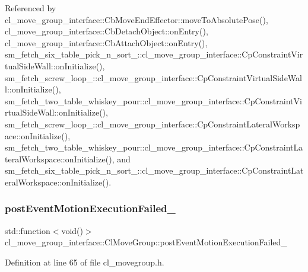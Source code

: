 Referenced by cl\+\_\+move\+\_\+group\+\_\+interface\+::\+Cb\+Move\+End\+Effector\+::move\+To\+Absolute\+Pose(), cl\+\_\+move\+\_\+group\+\_\+interface\+::\+Cb\+Detach\+Object\+::on\+Entry(), cl\+\_\+move\+\_\+group\+\_\+interface\+::\+Cb\+Attach\+Object\+::on\+Entry(), sm\+\_\+fetch\+\_\+six\+\_\+table\+\_\+pick\+\_\+n\+\_\+sort\+\_\+::cl\+\_\+move\+\_\+group\+\_\+interface\+::\+Cp\+Constraint\+Virtual\+Side\+Wall\+::on\+Initialize(), sm\+\_\+fetch\+\_\+screw\+\_\+loop\+\_\+::cl\+\_\+move\+\_\+group\+\_\+interface\+::\+Cp\+Constraint\+Virtual\+Side\+Wall\+::on\+Initialize(), sm\+\_\+fetch\+\_\+two\+\_\+table\+\_\+whiskey\+\_\+pour\+::cl\+\_\+move\+\_\+group\+\_\+interface\+::\+Cp\+Constraint\+Virtual\+Side\+Wall\+::on\+Initialize(), sm\+\_\+fetch\+\_\+screw\+\_\+loop\+\_\+::cl\+\_\+move\+\_\+group\+\_\+interface\+::\+Cp\+Constraint\+Lateral\+Workspace\+::on\+Initialize(), sm\+\_\+fetch\+\_\+two\+\_\+table\+\_\+whiskey\+\_\+pour\+::cl\+\_\+move\+\_\+group\+\_\+interface\+::\+Cp\+Constraint\+Lateral\+Workspace\+::on\+Initialize(), and sm\+\_\+fetch\+\_\+six\+\_\+table\+\_\+pick\+\_\+n\+\_\+sort\+\_\+::cl\+\_\+move\+\_\+group\+\_\+interface\+::\+Cp\+Constraint\+Lateral\+Workspace\+::on\+Initialize().

\mbox{\label{classcl__move__group__interface_1_1ClMoveGroup_ae7ade7ead3390b444ad4f802de1ec62d}} 
\subsubsection{\texorpdfstring{post\+Event\+Motion\+Execution\+Failed\+\_\+}{postEventMotionExecutionFailed\_}}
{\footnotesize\ttfamily std\+::function$<$void()$>$ cl\+\_\+move\+\_\+group\+\_\+interface\+::\+Cl\+Move\+Group\+::post\+Event\+Motion\+Execution\+Failed\+\_\+\hspace{0.3cm}{\ttfamily [private]}}



Definition at line 65 of file cl\+\_\+movegroup.\+h.



